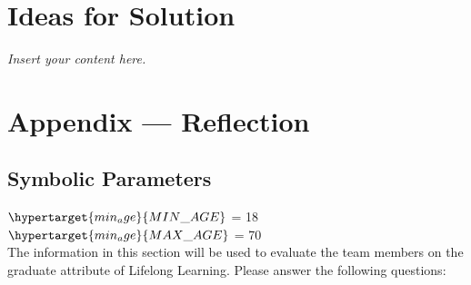 \documentclass[12pt]{article}
\newcommand{\lips}{\textit{Insert your content here.}}
\begin{document}
\section{Ideas for Solution}
\lips

\newpage{}
\section*{Appendix --- Reflection}
\subsection{Symbolic Parameters}
$\hypertarget{min_age}{MIN\_AGE}$ = 18\\
$\hypertarget{min_age}{MAX\_AGE}$ = 70\\

The information in this section will be used to evaluate the team members on the
graduate attribute of Lifelong Learning.  Please answer the following questions:
\end{document}

